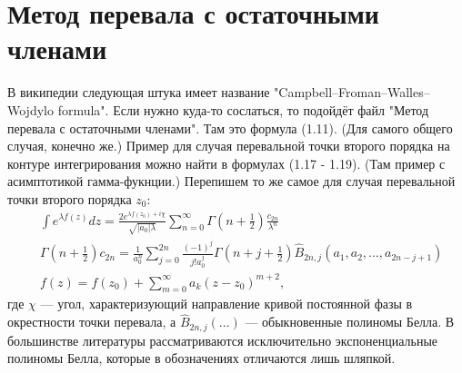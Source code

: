 \documentclass[a4paper, 12pt]{article}
\begin{document}
\section*{Метод перевала с остаточными членами}
В википедии следующая штука имеет название "Campbell–Froman–Walles–Wojdylo formula". Если нужно куда-то сослаться, то подойдёт файл "Метод перевала с остаточными членами". Там это формула (1.11). (Для самого общего случая, конечно же.) Пример для случая перевальной точки второго порядка на контуре интегрирования можно найти в формулах (1.17 - 1.19). (Там пример с асимптотикой гамма-фукнции.) Перепишем то же самое для случая перевальной точки второго порядка $z_0$:
\begin{equation}
\begin{aligned}
    &\int e^{\lambda f(z)} dz = \frac{2 e^{\lambda f(z_0)+i\chi}}{\sqrt{|a_0|\lambda}}\sum\limits_{n=0}^{\infty} \Gamma\left(n+\frac{1}{2}\right)\frac{c_{2n}}{\lambda^n} \\ 
    & \Gamma\left(n+\frac{1}{2}\right) c_{2n}= \frac{1}{a_0^n}\sum\limits_{j=0}^{2n}\frac{(-1)^j}{j! a_0^j} \Gamma\left(n+j+\frac{1}{2}\right) \hat{B}_{2n, j}\left(a_1, a_2, \dots, a_{2n-j+1}\right) \\
    & f(z) = f(z_0) + \sum\limits_{m=0}^{\infty} a_k (z-z_0)^{m+2},
\end{aligned}
\end{equation}
где $\chi$ --- угол, характеризующий направление кривой постоянной фазы в окрестности точки перевала, а $\hat{B}_{2n, j}\left(\dots\right)$ --- обыкновенные полиномы Белла. В большинстве литературы рассматриваются исключительно экспоненциальные полиномы Белла, которые в обозначениях отличаются лишь шляпкой.
\end{document}
